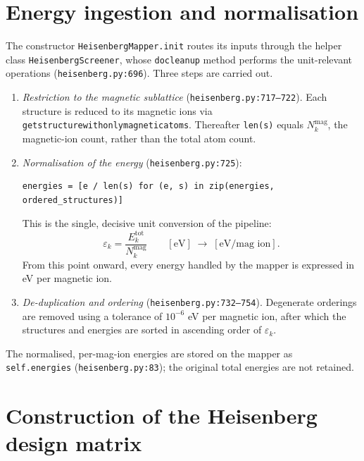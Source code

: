 \documentclass[11pt]{article}
\newcommand{\code}[1]{\texttt{\def\_{\textunderscore\allowbreak}#1}}
\begin{document}
\section{Energy ingestion and normalisation}
\label{sec:ingestion}

The constructor \code{HeisenbergMapper.\_\_init\_\_} routes its inputs through the
helper class \code{HeisenbergScreener}, whose \code{\_do\_cleanup} method performs
the unit-relevant operations (\code{heisenberg.py:696}). Three steps are carried
out.

\begin{enumerate}
  \item \emph{Restriction to the magnetic sublattice}
        (\code{heisenberg.py:717--722}). Each structure is reduced to its
        magnetic ions via \code{get\_structure\_with\_only\_magnetic\_atoms}.
        Thereafter \code{len(s)} equals $N_k^{\mathrm{mag}}$, the magnetic-ion
        count, rather than the total atom count.

  \item \emph{Normalisation of the energy} (\code{heisenberg.py:725}):
\begin{lstlisting}
energies = [e / len(s) for (e, s) in zip(energies, ordered_structures)]
\end{lstlisting}
        This is the single, decisive unit conversion of the pipeline:
        \begin{equation}
          \varepsilon_k = \frac{E_k^{\mathrm{tot}}}{N_k^{\mathrm{mag}}}
          \qquad [\text{eV}] \;\longrightarrow\; [\text{eV} / \text{mag ion}] .
        \end{equation}
        From this point onward, every energy handled by the mapper is expressed
        in eV per magnetic ion.

  \item \emph{De-duplication and ordering} (\code{heisenberg.py:732--754}).
        Degenerate orderings are removed using a tolerance of $10^{-6}$
        eV per magnetic ion, after which the structures and energies are sorted in
        ascending order of $\varepsilon_k$.
\end{enumerate}

The normalised, per-mag-ion energies are stored on the mapper as
\code{self.energies} (\code{heisenberg.py:83}); the original total energies are
not retained.

\section{Construction of the Heisenberg design matrix}
\label{sec:design}
\end{document}
